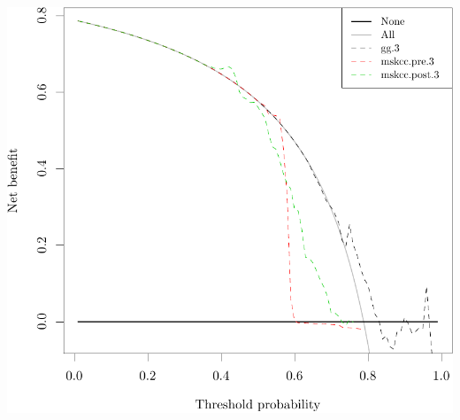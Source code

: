 \documentclass{article}\usepackage[]{graphicx}\usepackage[]{color}
\makeatletter
\def\maxwidth{ %
  \ifdim\Gin@nat@width>\linewidth
    \linewidth
  \else
    \Gin@nat@width
  \fi
}
\newenvironment{knitrout}{}{} %
\makeatother
\begin{document}
\begin{knitrout}
{\centering \includegraphics[width=\maxwidth]{figure/07-model-selection-dca-3} 

}



\end{knitrout}
\end{document}
